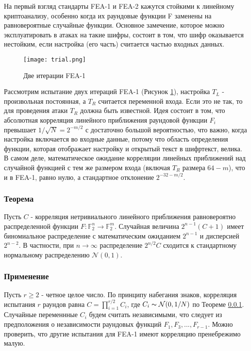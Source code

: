 \documentclass[utf8x, 14pt]{G7-32} %
\begin{document}
На первый взгляд стандарты FEA-1 и FEA-2 кажутся стойкими к линейному криптоанализу, особенно когда их раундовые функции F заменены на равновероятные случайные функции. Основное замечение, которое можно эксплуатировать в атаках на такие шифры, состоит в том, что шифр оказывается нестойким, если настройка (его часть) считается частью входных данных.

\begin{figure}[h!]
	\centering
	\texttt{[image: trial.png]}
	\caption{Две итерации FEA-1}
	\label{fig:trial}
\end{figure}

Рассмотрим испытание двух итераций FEA-1 (Рисунок \ref{fig:trial}), настройка $T_L$ - произвольная постоянная, а $T_R$ считается переменной входа. Если это не так, то для проведения атаки $T_R$ должна быть известной. Идея состоит в том, что абсолютная корреляция линейного приближения раундовой функции $F_i$ превышает $1/\sqrt{N} = 2^{-m/2}$ с достаточно большой вероятностью, что важно, когда настройка включается во входные данные, потому что область определения функции, которая отображает настройку и открытый текст в шифртекст, велика. В самом деле, математическое ожидание корреляции линейных приближений над случайной функцией с тем же размером входа (включая $T_R$ размера $64-m$), что и в FEA-1, равно нулю, а стандартное отклонение $2^{-32-m/2}$. 

\subsubsection{Теорема}\label{theorem}

 Пусть $C$ - корреляция нетривиального линейного приближения равновероятно распределенной функции $F: \mathbb{F}_2^n \to \mathbb{F}_2^m$. Случайная величина $2^{n-1}(C+1)$ имеет биномиальное распределение с математическим ожиданием $2^{n-1}$ и дисперсией $2^{n-2}$. В частности, при $n\to\infty$ распределение $2^{n/2}C$ сходится к стандартному нормальному распределению $\mathcal{N}(0,1)$.

\subsubsection{Применение}

Пусть $r\geq 2$ - четное целое число. По принципу набегания знаков, корреляция испытания $r$ раундов равна $C=\prod_{i=1}^{r/2} C_i$, где $C_i \thicksim \mathcal{N}(0,1/N)$ по Теореме \ref{theorem}. Случайные переменнные $C_i$ будем считать независимыми, что следует из предположения о независимости раундовых функций $F_1, F_3, ..., F_{r-1}$. Можно проверить, что другие испытания для FEA-1 имеют корреляцию пренебрежимо малую.
\end{document}
